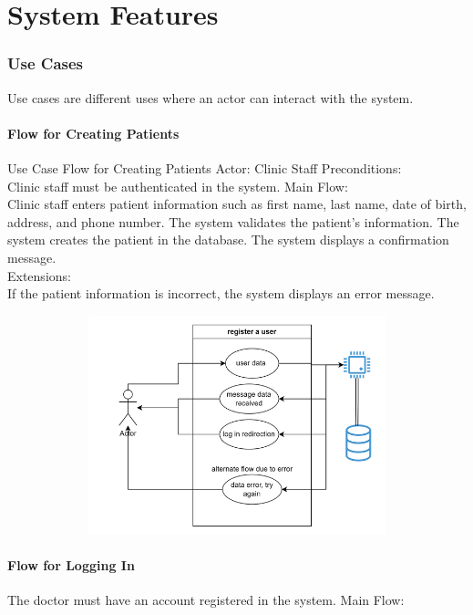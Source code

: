 \documentclass{scrreprt}
\begin{document}
	\chapter{System Features}
	\subsection{Use Cases}
	Use cases are different uses where an actor can interact with the system.
	\subsubsection{Flow for Creating Patients}
	Use Case Flow for Creating Patients
	Actor: Clinic Staff
	Preconditions:\\
	
	Clinic staff must be authenticated in the system.
	Main Flow:\\
	
	Clinic staff enters patient information such as first name, last name, date of birth, address, and phone number.
	The system validates the patient's information.
	The system creates the patient in the database.
	The system displays a confirmation message.\\
	
	Extensions:\\
	
	If the patient information is incorrect, the system displays an error message.
	
	\begin{figure}[h]
		\begin{center}
			\includegraphics[width=350pt,height=180pt]{usuario1.png}
		\end{center}
		\label{fig:Use case 1}
	\end{figure}
	\pagebreak
	\subsubsection{Flow for Logging In}
	The doctor  must have an account registered in the system.
	Main Flow:\\
	
\end{document}

